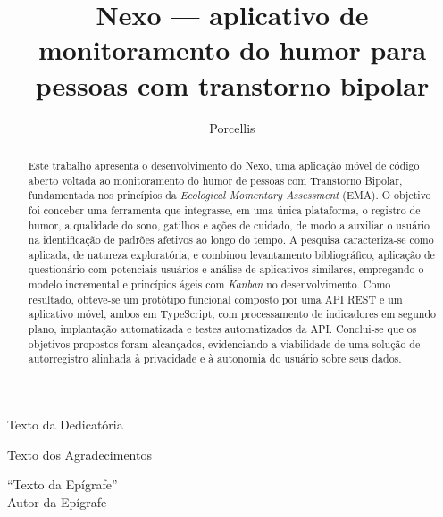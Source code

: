 \documentclass[tcc,capa,table]{textsi}
\title{Nexo --- aplicativo de monitoramento do humor para pessoas com transtorno bipolar}
\author{Porcellis}{Pedro Lucas}
\begin{document}


\maketitle

\sloppy

\fichacatalografica
\folhadeaprovacao

\begin{dedicatoria}
	Texto da Dedicatória
\end{dedicatoria}

\begin{agradecimentos}
	Texto dos Agradecimentos
\end{agradecimentos}

\begin{epigrafe}
	``Texto da Epígrafe'' \\
	Autor da Epígrafe
\end{epigrafe}

\begin{abstract}
\noindent
Este trabalho apresenta o desenvolvimento do Nexo, uma aplicação móvel de
código aberto voltada ao monitoramento do humor de pessoas com Transtorno
Bipolar, fundamentada nos princípios da \textit{Ecological Momentary
Assessment} (EMA). O objetivo foi conceber uma ferramenta que integrasse, em
uma única plataforma, o registro de humor, a qualidade do sono, gatilhos e
ações de cuidado, de modo a auxiliar o usuário na identificação de padrões
afetivos ao longo do tempo. A pesquisa caracteriza-se como aplicada, de
natureza exploratória, e combinou levantamento bibliográfico, aplicação de
questionário com potenciais usuários e análise de aplicativos similares,
empregando o modelo incremental e princípios ágeis com \textit{Kanban} no
desenvolvimento. Como resultado, obteve-se um protótipo funcional composto por
uma API REST e um aplicativo móvel, ambos em TypeScript, com processamento de
indicadores em segundo plano, implantação automatizada e testes automatizados
da API.
Conclui-se que os objetivos propostos foram alcançados, evidenciando a
viabilidade de uma solução de autorregistro alinhada à privacidade e à
autonomia do usuário sobre seus dados.
\end{abstract}
\end{document}
